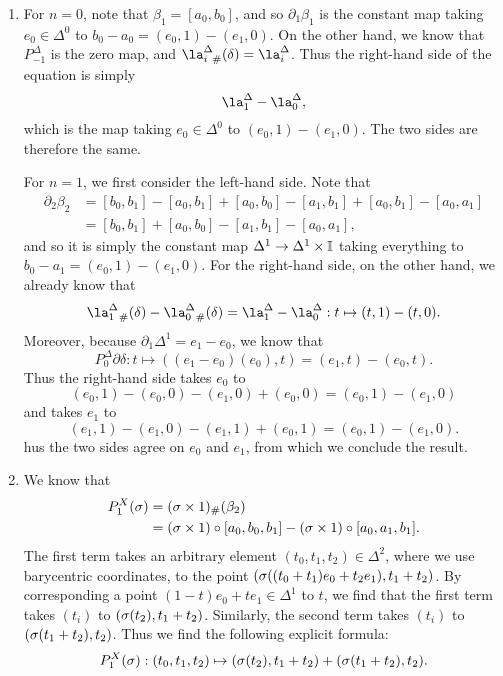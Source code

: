\documentclass[../../solutions.tex]{subfiles}
\begin{document}
\begin{exercise} \leavevmode
\begin{enumerate}
\item For $n=0$, note that $\beta_1=[a_0,b_0]$, and so $\partial_1\beta_1$ is the constant map taking $e_0\in\Delta^0$ to $b_0-a_0=(e_0,1)-(e_1,0)$. 
On the other hand, we know that $P_{-1}^\Delta$ is the zero map, and $\la_{i~\#}^\Delta(\delta)=\la_i^\Delta$. 
Thus the right-hand side of the equation is simply \[\la_1^\Delta-\la_0^\Delta,\] which is the map taking $e_0\in\Delta^0$ to $(e_0,1)-(e_1,0)$. 
The two sides are therefore the same. 

For $n=1$, we first consider the left-hand side. 
Note that \begin{align*}\partial_2\beta_2&=[b_0,b_1]-[a_0,b_1]+[a_0,b_0]-[a_1,b_1]+[a_0,b_1]-[a_0,a_1]\\&=[b_0,b_1]+[a_0,b_0]-[a_1,b_1]-[a_0,a_1],\end{align*} and so it is simply the constant map $\Delta^1\to\Delta^1\times\mathbb I$ taking everything to $b_0-a_1=(e_0,1)-(e_1,0)$. 
For the right-hand side, on the other hand, we already know that \[\la_{1~\#}^\Delta(\delta)-\la_{0~\#}^\Delta(\delta)=\la_1^\Delta-\la_0^\Delta:t\mapsto(t,1)-(t,0).\] 
Moreover, because $\partial_1\Delta^1=e_1-e_0$, we know that \[P_0^\Delta\partial\delta:t\mapsto((e_1-e_0)(e_0),t)=(e_1,t)-(e_0,t).\] 
Thus the right-hand side takes $e_0$ to \[(e_0,1)-(e_0,0)-(e_1,0)+(e_0,0)=(e_0,1)-(e_1,0)\] and takes $e_1$ to \[(e_1,1)-(e_1,0)-(e_1,1)+(e_0,1)=(e_0,1)-(e_1,0).\] 
hus the two sides agree on $e_0$ and $e_1$, from which we conclude the result. 

\item We know that \begin{align*}P_1^X(\sigma)&=(\sigma\times1)_\#(\beta_2)\\&=(\sigma\times1)\circ[a_0,b_0,b_1]-(\sigma\times1)\circ[a_0,a_1,b_1].\end{align*} 
The first term takes an arbitrary element $(t_0,t_1,t_2)\in\Delta^2$, where we use barycentric coordinates, to the point $(\sigma((t_0+t_1)e_0+t_2e_1),t_1+t_2)$. 
By corresponding a point $(1-t)e_0+te_1\in\Delta^1$ to $t$, we find that the first term takes $(t_i)$ to $(\sigma(t_2),t_1+t_2)$. 
Similarly, the second term takes $(t_i)$ to $(\sigma(t_1+t_2),t_2)$. 
Thus we find the following explicit formula: \[P_1^X(\sigma):(t_0,t_1,t_2)\mapsto(\sigma(t_2),t_1+t_2)+(\sigma(t_1+t_2),t_2).\]
\end{enumerate}
\end{exercise}
\end{document}
